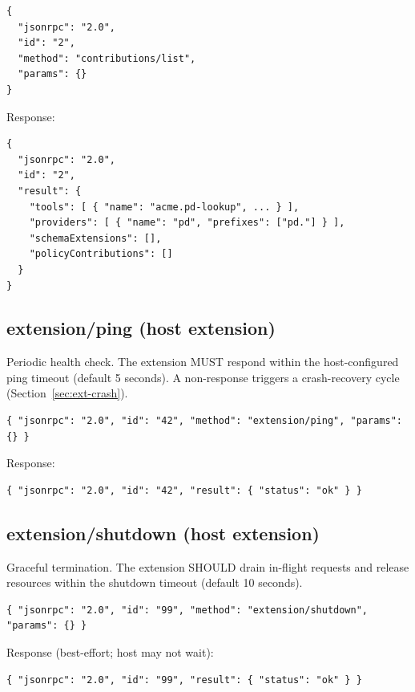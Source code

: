 \begin{verbatim}
{
  "jsonrpc": "2.0",
  "id": "2",
  "method": "contributions/list",
  "params": {}
}
\end{verbatim}

Response:

\begin{verbatim}
{
  "jsonrpc": "2.0",
  "id": "2",
  "result": {
    "tools": [ { "name": "acme.pd-lookup", ... } ],
    "providers": [ { "name": "pd", "prefixes": ["pd."] } ],
    "schemaExtensions": [],
    "policyContributions": []
  }
}
\end{verbatim}

\subsection{extension/ping (host \textrightarrow{} extension)}

Periodic health check.  The extension MUST respond within the host-configured
ping timeout (default 5 seconds).  A non-response triggers a crash-recovery
cycle (Section~\ref{sec:ext-crash}).

\begin{verbatim}
{ "jsonrpc": "2.0", "id": "42", "method": "extension/ping", "params": {} }
\end{verbatim}

Response:

\begin{verbatim}
{ "jsonrpc": "2.0", "id": "42", "result": { "status": "ok" } }
\end{verbatim}

\subsection{extension/shutdown (host \textrightarrow{} extension)}

Graceful termination.  The extension SHOULD drain in-flight requests and
release resources within the shutdown timeout (default 10 seconds).

\begin{verbatim}
{ "jsonrpc": "2.0", "id": "99", "method": "extension/shutdown", "params": {} }
\end{verbatim}

Response (best-effort; host may not wait):

\begin{verbatim}
{ "jsonrpc": "2.0", "id": "99", "result": { "status": "ok" } }
\end{verbatim}

